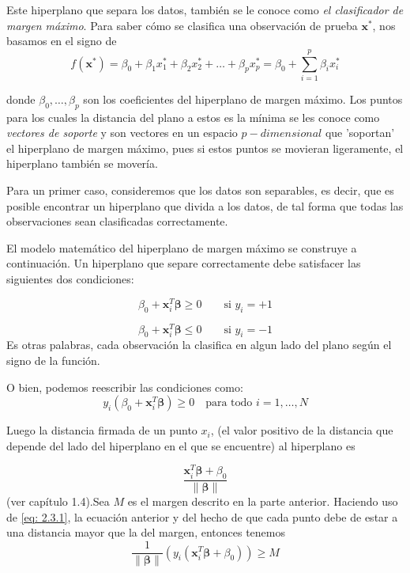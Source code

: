 \documentclass[letterpaper,12pt,oneside]{book}
\begin{document}
{{{Este hiperplano que separa los datos, también se le conoce como \textit{el clasificador de margen máximo}. Para saber cómo se clasifica una observación de prueba \( \mathbf{x}^* \), nos basamos en el signo de
$$ f(\mathbf{x}^*) = \beta_0 + \beta_1 x^*_1 + \beta_2 x^*_2 + \dots + \beta_p x^*_p = \beta_0 + \sum_{i=1}^{p} \beta_i x^{*}_i $$

donde \( \beta_0, \ldots, \beta_p \) son los coeficientes del hiperplano de margen máximo. Los puntos para los cuales la distancia del plano a estos es la mínima se les conoce como \textit{vectores de soporte} y son vectores en un espacio \( p -dimensional\) que 'soportan' el hiperplano de margen máximo, pues si estos puntos se movieran ligeramente, el hiperplano también se movería.

Para un primer caso, consideremos que los datos son separables, es decir, que es posible encontrar un hiperplano que divida a los datos, de tal forma que todas las observaciones sean clasificadas correctamente.

El modelo matemático del hiperplano de margen máximo se construye a continuación. Un hiperplano que separe correctamente debe satisfacer las siguientes dos condiciones:

    
    \begin{equation}
    	\beta_0+ \mathbf{x}_i^T \boldsymbol{\beta} \geq 0 \qquad \text{si } y_i = +1 			\label{eq: 2.1}
    \end{equation}
    
     \begin{equation}
    	\beta_0+ \mathbf{x}_i^T \boldsymbol{\beta} \leq 0 \qquad \text{si } y_i = -1
    	\label{eq: 2.2}
    \end{equation}
    Es otras palabras, cada observación la clasifica en algun lado del plano según el signo de la función.
       
        O bien, podemos reescribir las condiciones como: 
        \begin{equation}
             y_i (\beta_0 + \mathbf{x}_i^T \boldsymbol{\beta}) \geq 0 \quad \text{para todo } i = 1, \ldots, N \label{eq: 2.3.1}
        \end{equation}
        
        Luego la distancia firmada de un punto $x_i$, (el valor positivo de la distancia que depende del lado del hiperplano en el que se encuentre) al hiperplano es
    
        \begin{equation}
            \frac{ \mathbf{x}_i^T \boldsymbol{\beta} + \beta_0}{\|\boldsymbol{\beta}\|}
        \end{equation}
        (ver capítulo 1.4).Sea \(M\) es el margen descrito en la parte anterior. Haciendo uso de \eqref{eq: 2.3.1}, la ecuación anterior y del hecho de que cada punto debe de estar a una distancia mayor que la del margen, entonces tenemos
        \begin{equation}
        \frac{1}{\|\boldsymbol{\beta}\|} (y_i  (\mathbf{x}_i^T \boldsymbol{\beta} + \beta_0))  \geq M \label{eq: 2.5}
        \end{equation}
         
}}}
\end{document}
